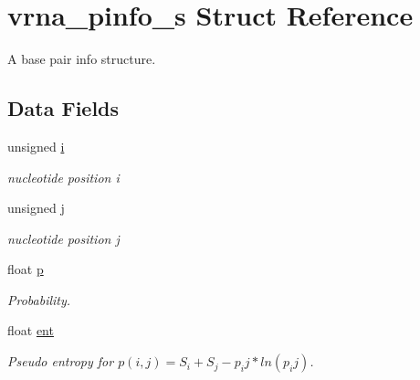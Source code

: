 \hypertarget{structvrna__pinfo__s}{}\section{vrna\+\_\+pinfo\+\_\+s Struct Reference}
\label{structvrna__pinfo__s}


A base pair info structure.  


\subsection*{Data Fields}
\begin{DoxyCompactItemize}
\item 
\mbox{\label{structvrna__pinfo__s_ab91db0a87ef8402dc151795ba5a64c6f}} 
unsigned \mbox{\hyperlink{structvrna__pinfo__s_ab91db0a87ef8402dc151795ba5a64c6f}{i}}
\begin{DoxyCompactList}\small\item\em nucleotide position i \end{DoxyCompactList}\item 
\mbox{\label{structvrna__pinfo__s_a4142e38d6ba127acccdf680300a88e1f}} 
unsigned \mbox{\hyperlink{structvrna__pinfo__s_a4142e38d6ba127acccdf680300a88e1f}{j}}
\begin{DoxyCompactList}\small\item\em nucleotide position j \end{DoxyCompactList}\item 
\mbox{\label{structvrna__pinfo__s_a71990eae41fa100db8b557e4512ec281}} 
float \mbox{\hyperlink{structvrna__pinfo__s_a71990eae41fa100db8b557e4512ec281}{p}}
\begin{DoxyCompactList}\small\item\em Probability. \end{DoxyCompactList}\item 
\mbox{\label{structvrna__pinfo__s_a5ab2a63f3da8e12c6d54d8e9dd9e3e73}} 
float \mbox{\hyperlink{structvrna__pinfo__s_a5ab2a63f3da8e12c6d54d8e9dd9e3e73}{ent}}
\begin{DoxyCompactList}\small\item\em Pseudo entropy for $ p(i,j) = S_i + S_j - p_ij*ln(p_ij) $. \end{DoxyCompactList}\item 

\end{DoxyCompactItemize}
